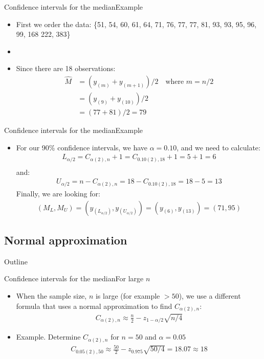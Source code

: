 \documentclass[xcolor=dvipsnames]{beamer}
\begin{document}
\begin{frame}{Confidence intervals for the median}{Example}
\begin{itemize}
	\item First we order the data: \{51, 54, 60, 61, 64, 71, 76, 77, 77, 81, 93, 93, 95, 96, 99, 168 222, 383\}
	\item[]
	\item Since there are 18 observations:
	\begin{align*}
		\hat{M} &= (y_{(m)} + y_{(m+1)})/2 \quad \text{where } m = n/2 \\
		&=(y_{(9)} + y_{(10)})/2 \\
		&= (77 + 81)/2 = 79
	\end{align*}
\end{itemize}
\end{frame}

\begin{frame}{Confidence intervals for the median}{Example}
\begin{itemize}
	\item For our 90\% confidence intervals, we have $\alpha = 0.10$, and we need to calculate:
	\begin{align*}
		L_{\alpha /2} = C_{\alpha (2), n} +1 = C_{0.10(2), 18} +1 = 5+1=6 \\
	\end{align*} 
	and:
	\begin{align*}
		U_{\alpha /2} = n- C_{\alpha (2), n} = 18 - C_{0.10(2), 18} = 18-5 = 13
	\end{align*}
	Finally, we are looking for:
	\begin{align*}
		(M_L, M_U) = (y_{(L_{\alpha / 2})}, y_{(U_{\alpha/2})}) = (y_{(6)}, y_{(13)}) = (71, 95)
	\end{align*}
\end{itemize}
\end{frame}

\subsection{Normal approximation}
\begin{frame}{Outline}
\tableofcontents[currentsection,subsectionstyle=show/shaded/hide]
\end{frame}

\begin{frame}{Confidence intervals for the median}{For large $n$}
	\begin{itemize}
		\item When the sample size, $n$ is large (for example $>50$), we use a different formula that uses a normal approximation to find $C_{\alpha(2),n}$:
		\begin{gather*}
		C_{\alpha(2),n} \approx \frac{n}{2} - z_{1-\alpha / 2} \sqrt{n/4}
		\end{gather*}
		\item Example. Determine $C_{\alpha(2),n}$ for $n = 50$ and $\alpha = 0.05$
		\begin{gather*}
		C_{0.05(2),50} \approx \frac{50}{2} - z_{0.975} \sqrt{50/4} = 18.07 \approx 18
		\end{gather*}
	\end{itemize}
\end{frame}
\end{document}
